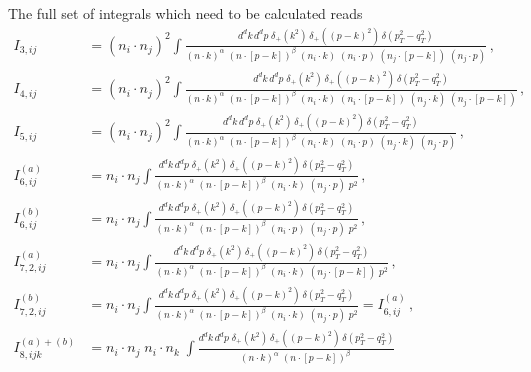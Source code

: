 \documentclass[a4paper,11pt]{article}
\numberwithin{equation}{section}
\begin{document}
The full set of integrals which need to be calculated reads 
%
\begin{subequations}
  \label{eq:fullset}
  \begin{align}
    I_{3, ij} &= 
    (n_i \cdot n_j)^2
    \int 
    \frac{d^d k\, d^d p\;\delta_+(k^2)\, \delta_+((p-k)^2)\,\delta(p_T^2-q_T^2)}
      {(n \cdot k)^\alpha\; (n \cdot [p-k])^\beta \; 
      (n_i \cdot k) \; (n_i \cdot p) \; (n_j \cdot [p-k]) \; (n_j \cdot p)} \, ,
    \\[0.7em]
    I_{4, ij} &= 
    (n_i \cdot n_j)^2
    \int 
    \frac{d^d k\, d^d p\;\delta_+(k^2)\, \delta_+((p-k)^2)\,\delta(p_T^2-q_T^2)}
      {(n \cdot k)^\alpha\; (n \cdot [p-k])^\beta \;
      (n_i \cdot k) \; (n_i \cdot [p-k]) \;
      (n_j \cdot k) \; (n_j \cdot [p-k])} \, ,
    \\[0.7em]
    I_{5, ij} &=
    (n_i \cdot n_j)^2
    \int 
    \frac{d^d k\, d^d p\;\delta_+(k^2)\, \delta_+((p-k)^2)\,\delta(p_T^2-q_T^2)}
      {(n \cdot k)^\alpha\; (n \cdot [p-k])^\beta  \;
      (n_i \cdot k) \; (n_i \cdot p) \; 
      (n_j \cdot k) \; (n_j \cdot p)} \, , 
    \\[0.7em]
    I^{(a)}_{6,ij} &=
    n_i \cdot n_j
     \int 
    \frac{d^d k\, d^d p\;\delta_+(k^2)\, \delta_+((p-k)^2)\,\delta(p_T^2-q_T^2)}
      {(n \cdot k)^\alpha\; (n \cdot [p-k])^\beta  \;
      (n_i \cdot k) \; (n_j \cdot p) \; p^2} \, , 
    \\[0.7em]
    I^{(b)}_{6,ij} &=
    n_i \cdot n_j
    \int 
    \frac{d^d k\, d^d p\;\delta_+(k^2)\, \delta_+((p-k)^2)\,\delta(p_T^2-q_T^2)}
      {(n \cdot k)^\alpha\; (n \cdot [p-k])^\beta  \;
      (n_i \cdot p) \; (n_j \cdot p) \; p^2} \, , 
    \\[0.7em]
    I^{(a)}_{7,2, ij} &=
    n_i \cdot n_j
    \int 
    \frac{d^d k\, d^d p\;\delta_+(k^2)\, \delta_+((p-k)^2)\,\delta(p_T^2-q_T^2)}
      {(n \cdot k)^\alpha\; (n \cdot [p-k])^\beta  \;
      (n_i \cdot k) \;  (n_j \cdot [p-k]) \; p^2} \, ,
    \\[0.7em]
    I^{(b)}_{7,2, ij} &=
    n_i \cdot n_j
    \int 
    \frac{d^d k\, d^d p\;\delta_+(k^2)\, \delta_+((p-k)^2)\,\delta(p_T^2-q_T^2)}
      {(n \cdot k)^\alpha\; (n \cdot [p-k])^\beta  \;
      (n_i \cdot k) \; (n_j \cdot p) \; p^2} = I^{(a)}_{6,ij}\, ,
    \\[0.7em]
    I_{8, ijk}^{(a)+(b)} &= 
    n_i \cdot n_j\; n_i \cdot n_k\; 
    \int 
    \frac{d^d k\, d^d p\;\delta_+(k^2)\, \delta_+((p-k)^2)\,\delta(p_T^2-q_T^2)}
      {(n \cdot k)^\alpha\; (n \cdot [p-k])^\beta \; 
}
\end{align}
\end{subequations}
\end{document}
